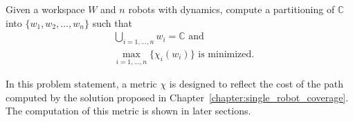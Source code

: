 \documentclass[../main.tex]{subfiles}
\begin{document}

\begin{problem}
\label{problem:workspace_partitioning}
	Given a workspace $W$ and $n$ robots with dynamics, compute a partitioning of $\mathbb{C}$ into $\{w_1,w_2,\dots,w_n\}$ such that
	\begin{equation}
	\begin{aligned}
		& \bigcup_{i=1,\dots,n}w_i=\mathbb{C}\text{ and}\\
		& \max_{i=1,\ldots,n}\{\chi_i(w_i)\}\text{ is minimized.}
	\end{aligned}
	\end{equation}
\end{problem}
In this problem statement, a metric $\chi$ is designed to reflect the cost of the path computed by the solution proposed in Chapter~\ref{chapter:single_robot_coverage}. The computation of this metric is shown in later sections.
\end{document}
